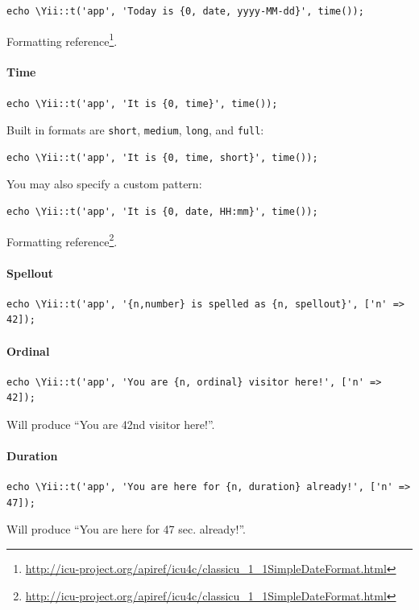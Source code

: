 \lstset{language=php}\begin{lstlisting}
echo \Yii::t('app', 'Today is {0, date, yyyy-MM-dd}', time());
\end{lstlisting}
Formatting reference\footnote{\url{http://icu-project.org/apiref/icu4c/classicu\_1\_1SimpleDateFormat.html}}.

\paragraph{Time}
\lstset{language=php}\begin{lstlisting}
echo \Yii::t('app', 'It is {0, time}', time());
\end{lstlisting}
Built in formats are \lstinline|short|, \lstinline|medium|, \lstinline|long|, and \lstinline|full|:

\lstset{language=php}\begin{lstlisting}
echo \Yii::t('app', 'It is {0, time, short}', time());
\end{lstlisting}
You may also specify a custom pattern:

\lstset{language=php}\begin{lstlisting}
echo \Yii::t('app', 'It is {0, date, HH:mm}', time());
\end{lstlisting}
Formatting reference\footnote{\url{http://icu-project.org/apiref/icu4c/classicu\_1\_1SimpleDateFormat.html}}.

\paragraph{Spellout}
\lstset{language=php}\begin{lstlisting}
echo \Yii::t('app', '{n,number} is spelled as {n, spellout}', ['n' => 42]);
\end{lstlisting}
\paragraph{Ordinal}
\lstset{language=php}\begin{lstlisting}
echo \Yii::t('app', 'You are {n, ordinal} visitor here!', ['n' => 42]);
\end{lstlisting}
Will produce ``You are 42nd visitor here!''.

\paragraph{Duration}
\lstset{language=php}\begin{lstlisting}
echo \Yii::t('app', 'You are here for {n, duration} already!', ['n' => 47]);
\end{lstlisting}
Will produce ``You are here for 47 sec. already!''.

